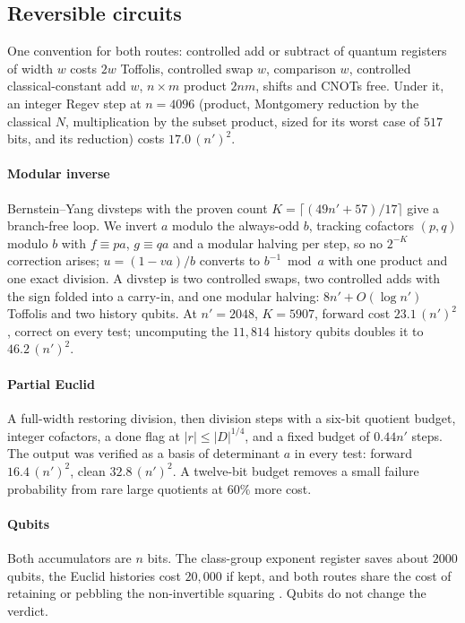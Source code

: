 \documentclass[conference]{IEEEtran}
\begin{document}
\subsection{Reversible circuits}
One convention for both routes: controlled add or subtract of quantum registers of width $w$ costs $2w$ Toffolis, controlled swap $w$, comparison $w$, controlled classical-constant add $w$, $n\times m$ product $2nm$, shifts and CNOTs free. Under it, an integer Regev step at $n=4096$ (product, Montgomery reduction by the classical $N$, multiplication by the subset product, sized for its worst case of $517$ bits, and its reduction) costs $17.0\,(n')^2$.

\paragraph*{Modular inverse} Bernstein--Yang divsteps \cite{bernstein2019} with the proven count $K=\lceil(49n'+57)/17\rceil$ give a branch-free loop. We invert $a$ modulo the always-odd $b$, tracking cofactors $(p,q)$ modulo $b$ with $f\equiv pa$, $g\equiv qa$ and a modular halving per step, so no $2^{-K}$ correction arises; $u=(1-va)/b$ converts to $b^{-1}\bmod a$ with one product and one exact division. A divstep is two controlled swaps, two controlled adds with the sign folded into a carry-in, and one modular halving: $8n'+O(\log n')$ Toffolis and two history qubits. At $n'=2048$, $K=5907$, forward cost $23.1\,(n')^2$, correct on every test; uncomputing the $11{,}814$ history qubits doubles it to $46.2\,(n')^2$.

\paragraph*{Partial Euclid} A full-width restoring division, then division steps with a six-bit quotient budget, integer cofactors, a done flag at $|r|\le|D|^{1/4}$, and a fixed budget of $0.44n'$ steps. The output was verified as a basis of determinant $a$ in every test: forward $16.4\,(n')^2$, clean $32.8\,(n')^2$. A twelve-bit budget removes a small failure probability from rare large quotients at $60\%$ more cost.

\paragraph*{Qubits} Both accumulators are $n$ bits. The class-group exponent register saves about $2000$ qubits, the Euclid histories cost $20{,}000$ if kept, and both routes share the cost of retaining or pebbling the non-invertible squaring \cite{ragavan2024}. Qubits do not change the verdict.
\end{document}
